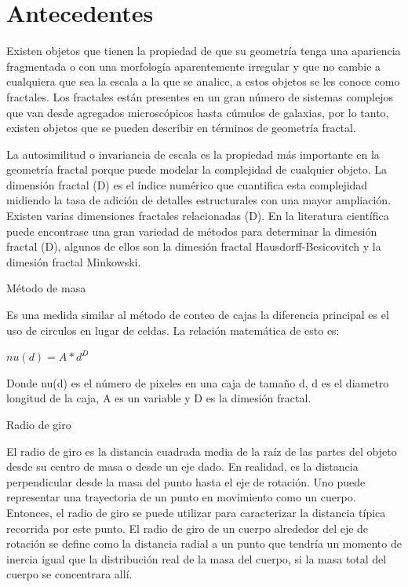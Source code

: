 \documentclass[11pt]{article}
\begin{document}
\section{Antecedentes}



Existen objetos que tienen la propiedad de que su geometría tenga una apariencia fragmentada o con una morfología aparentemente irregular y que no cambie a cualquiera que sea la escala a la que se analice, a estos objetos se les conoce como fractales. Los fractales están presentes en un gran número de sistemas complejos que van desde agregados microscópicos hasta cúmulos de galaxias, por lo tanto, existen objetos que se pueden describir en términos de geometría fractal. 

La autosimilitud o invariancia de escala es la propiedad más importante en la geometría fractal porque puede modelar la complejidad de cualquier objeto. La dimensión fractal (D) es el índice numérico que cuantifica esta complejidad midiendo la tasa de adición de detalles estructurales con una mayor ampliación. Existen varias dimensiones fractales relacionadas (D). En la literatura científica puede encontrase una gran variedad de métodos para determinar la dimesión fractal (D), algunos de ellos son la dimesión fractal Hausdorff-Besicovitch y la dimesión fractal Minkowski.


Método de masa

Es una medida similar al método de conteo de cajas la diferencia principal es el uso de circulos en lugar de celdas. La relación matemática de esto es:

$nu(d) = A*d^D$

Donde nu(d) es el número de pixeles en una caja de tamaño d, d es el diametro longitud de la caja, A es un variable y D es la dimesión fractal. 

Radio de giro

El radio de giro es la distancia cuadrada media de la raíz de las partes del objeto desde su centro de masa o desde un eje dado. En realidad, es la distancia perpendicular desde la masa del punto hasta el eje de rotación. Uno puede representar una trayectoria de un punto en movimiento como un cuerpo. Entonces, el radio de giro se puede utilizar para caracterizar la distancia típica recorrida por este punto. El radio de giro de un cuerpo alrededor del eje de rotación se define como la distancia radial a un punto que tendría un momento de inercia igual que la distribución real de la masa del cuerpo, si la masa total del cuerpo se concentrara allí.
\end{document}
